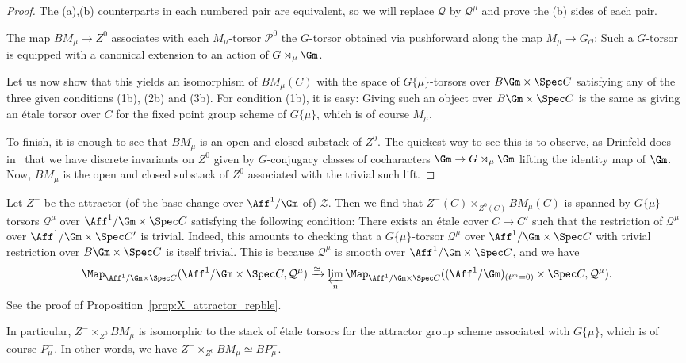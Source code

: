 \documentclass[10pt]{amsart}
\begin{document}
\begin{proof}
The (a),(b) counterparts in each numbered pair are equivalent, so we will replace $\mathcal{Q}$ by $\mathcal{Q}^\mu$ and prove the (b) sides of each pair.

The map $BM_\mu\to Z^0$ associates with each $M_\mu$-torsor $\mathcal{P}^0$ the $G$-torsor obtained via pushforward along the map $M_\mu\to G_{\mathcal{O}}$: Such a $G$-torsor is equipped with a canonical extension to an action of $G\rtimes_{\mu}\Gm$.

Let us now show that this yields an isomorphism of $BM_\mu(C)$ with the space of $G\{\mu\}$-torsors over $B\Gm\times \Spec C$ satisfying any of the three given conditions (1b), (2b) and (3b). For condition (1b), it is easy: Giving such an object over $B\Gm\times \Spec C$ is the same as giving an \'etale torsor over $C$ for the fixed point group scheme of $G\{\mu\}$, which is of course $M_\mu$. 

To finish, it is enough to see that $BM_\mu$ is an open and closed substack of $Z^0$. The quickest way to see this is to observe, as Drinfeld does in~\cite[\S C.2.3]{drinfeld2023shimurian} that we have discrete invariants on $Z^0$ given by $G$-conjugacy classes of cocharacters $\Gm\to G\rtimes_\mu \Gm$ lifting the identity map of $\Gm$. Now, $BM_\mu$ is the open and closed substack of $Z^0$ associated with the trivial such lift.
\end{proof}


\begin{remark}
\label{rem:BGmu_simple}
Let $Z^-$ be the attractor (of the base-change over $\Aff^1/\Gm$ of) $\mathcal{Z}$. Then we find that $Z^-(C)\times_{Z^0(C)}BM_\mu(C)$ is spanned by $G\{\mu\}$-torsors $\mathcal{Q}^\mu$ over $\Aff^1/\Gm\times\Spec C$ satisfying the following condition: There exists an \'etale cover $C\to C'$ such that the restriction of $\mathcal{Q}^\mu$ over $\Aff^1/\Gm\times \Spec C'$ is trivial. Indeed, this amounts to checking that a $G\{\mu\}$-torsor $\mathcal{Q}^\mu$ over $\Aff^1/\Gm\times \Spec C$ with trivial restriction over $B\Gm\times\Spec C$ is itself trivial. This is because $\mathcal{Q}^\mu$ is smooth over $\Aff^1/\Gm\times \Spec C$, and we have
\[
\Map_{\Aff^1/\Gm\times \Spec C}(\Aff^1/\Gm\times\Spec C,\mathcal{Q}^\mu)\xrightarrow{\simeq}\varprojlim_n\Map_{\Aff^1/\Gm\times \Spec C}((\Aff^1/\Gm)_{(t^m=0)}\times\Spec C,\mathcal{Q}^\mu).
\]
See the proof of Proposition~\ref{prop:X_attractor_repble}.

In particular, $Z^-\times_{Z^0}BM_\mu$ is isomorphic to the stack of \'etale torsors for the attractor group scheme associated with $G\{\mu\}$, which is of course $P^-_{\mu}$. In other words, we have $Z^-\times_{Z^0}BM_\mu\simeq BP^-_\mu$.
\end{remark}
\end{document}
